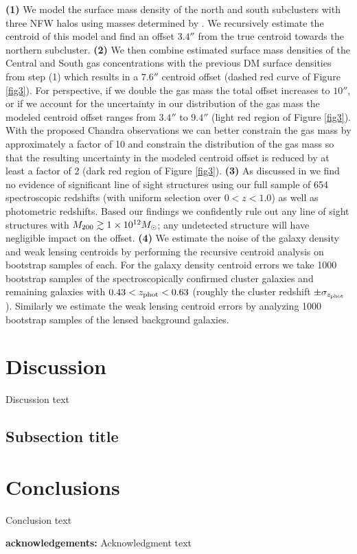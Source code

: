 \textbf{(1)} We model the surface mass density of the north and south subclusters with three NFW halos using masses determined by \citet{Dawson:2012dl}. We recursively estimate the centroid of this model and find an offset $3.4''$ from the true centroid towards the northern subcluster. 
\textbf{(2)} We then combine estimated surface mass densities of the
Central and South gas concentrations with the previous DM surface
densities from step (1) which results in a $7.6''$ centroid offset (dashed red curve of Figure \ref{fig3}).  
For perspective, if we double the gas mass the total offset increases to $10''$, or if we account for the uncertainty in our distribution of the gas mass the modeled centroid offset ranges from $3.4''$ to $9.4''$ (light red region of Figure \ref{fig3}). 
With the proposed Chandra observations we can better constrain the gas mass by approximately a factor of 10 and constrain the distribution of the gas mass so that the resulting uncertainty in the modeled centroid offset is reduced by at least a factor of 2 (dark red region of Figure \ref{fig3}).
\textbf{(3)} As discussed in \citet{Dawson:2012dl} we find no evidence of significant line of sight structures using our full sample of 654 spectroscopic redshifts (with uniform selection over $0<z<1.0$) as well as photometric redshifts. 
Based our findings we confidently rule out any line of sight structures with $M_{\rm 200}\gtrsim1\times10^{12} M_\odot$; any undetected structure will have negligible impact on the offset.
\textbf{(4)} We estimate the noise of the galaxy density and weak lensing centroids by performing the recursive centroid analysis on bootstrap samples of each.
For the galaxy density centroid errors we take 1000 bootstrap samples of the spectroscopically confirmed cluster galaxies and remaining galaxies with $0.43<z_{\rm phot}<0.63$ (roughly the cluster redshift $\pm\sigma_{z_{\rm phot}}$).
Similarly we estimate the weak lensing centroid errors by analyzing 1000 bootstrap samples of the lensed background galaxies.

\section{Discussion}

Discussion text

\subsection{Subsection title}

\section{Conclusions}

Conclusion text

\textbf{acknowledgements:}
Acknowledgment text

%



%
%  
